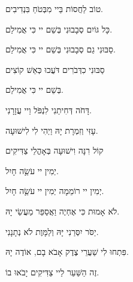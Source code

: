 {\hspace{4em}
טוֹב לַחֲסוֹת בַּיי 
\hspace{2em}
מִבְּטֹחַ בִּנְדִיבִים. 

\hspace{5em}
כָּל גּוֹיִם סְבָבוּנִי 
\hspace{2em}
בְּשֵׁם יי כִּי אֲמִילַם.
 
\hspace{6em}
סַבּוּנִי גַם סְבָבוּנִי 
\hspace{2em}
בְּשֵׁם יי כִּי אֲמִילַם. 

\hspace{7em}
סַבּוּנִי כִדְּבֹרִים
\hspace{2em}
דֹּעֲכוּ כְּאֵשׁ קוֹצִים 

\hspace{18em}
בְּשֵׁם יי כִּי אֲמִילַם. 

\hspace{8em}
דָּחֹה דְּחִיתַנִי לִנְפֹּל 
\hspace{3em}
וַיי עֲזָרָנִי. 

\hspace{10em}
עָזִּי וְזִמְרָת יָהּ 
\hspace{4em}
וַיְהִי לִי לִישׁוּעָה.

\hspace{11em}
קוֹל רִנָּה וִישׁוּעָה 
\hspace{2em}
בְּאָהֳלֵי צַדִּיקִים 

\hspace{22em}
יְמִין יי עֹשֵָׂה חָיִל. 

\hspace{11em}
יְמִין יי רוֹמֵמָה 
\hspace{4em}
יְמִין יי עֹשֵָׂה חָיִל. 

\hspace{10em}
לֹא אָמוּת כִּי אֶחְיֶה
\hspace{2em}
וַאֲסַפֵּר מַעֲשֵׂי יָהּ. 

\hspace{9em}
יַסֹּר יִסְּרַנִי יָּהּ
\hspace{5em}
וְלַמָּוֶת לֹא נְתָנָנִי. 

\hspace{6em}
פִּתְחוּ לִי שַׁעֲרֵי צֶדֶק
\hspace{3em}
אָבֹא בָם, אוֹדֶה יָהּ. 

\hspace{7em}
זֶה הַשַּׁעַר לַיי
\hspace{3em}
צַדִּיקִים יָבֹאוּ בוֹ. 

\vspace{-1em}
\begin{center}
\begin{tabular}{l p{2em} r l}


\end{tabular}
\end{center}}
